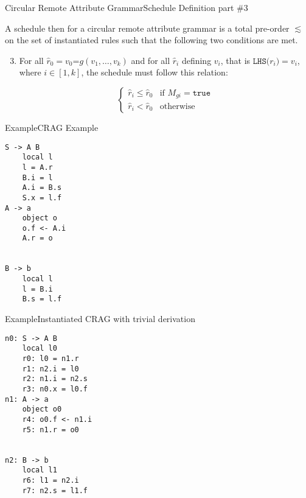 \begin{frame}{Circular Remote Attribute Grammar}{Schedule Definition part \#3}
\begin{definition}
A schedule then for a circular remote attribute grammar is a total pre-order $\lesssim$ on the set of instantiated rules such that the following two conditions are met.

\begin{enumerate}
\setcounter{enumi}{2}
  \item For all $\hat{r}_0 = v_0 \texttt{=} g(v_1, \dots , v_k)$ and for all $\hat{r}_i$ defining $v_i$, that is $\texttt{LHS($r_i$)} = v_i$, where $i \in [1, k]$, the schedule must follow this relation:
  
  \[ 
  \begin{cases}
  \hat{r}_i \le \hat{r}_0   & \text{if } M_{gi} = \texttt{true} \\
  \hat{r}_i < \hat{r}_0 & \text{otherwise}
  \end{cases}
  \]
\end{enumerate}
\end{definition}
\end{frame}


\begin{frame}[fragile=singleslide]{Example}{CRAG Example}

\begin{multicols}{3}
\begin{Verbatim}[fontsize=\small]
S -> A B
    local l
    l = A.r
    B.i = l
    A.i = B.s
    S.x = l.f
A -> a
    object o
    o.f <- A.i
    A.r = o


B -> b
    local l
    l = B.i
    B.s = l.f
\end{Verbatim}
\end{multicols}
    
\end{frame}


\begin{frame}[fragile=singleslide]{Example}{Instantiated CRAG with trivial derivation}

\begin{multicols}{3}
\begin{Verbatim}[fontsize=\small]
n0: S -> A B
    local l0
    r0: l0 = n1.r
    r1: n2.i = l0
    r2: n1.i = n2.s
    r3: n0.x = l0.f
n1: A -> a
    object o0
    r4: o0.f <- n1.i
    r5: n1.r = o0


n2: B -> b
    local l1
    r6: l1 = n2.i
    r7: n2.s = l1.f
\end{Verbatim}
\end{multicols}


\end{frame}

